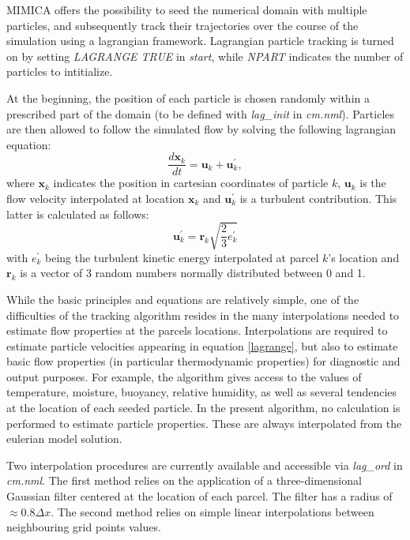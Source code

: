 \documentclass[12pt,A4,french]{article}
\begin{document}
MIMICA offers the possibility to seed the numerical domain with multiple particles, and subsequently track their trajectories over the course of the simulation using a lagrangian framework. Lagrangian particle tracking is turned on by setting {\it LAGRANGE TRUE} in {\it start}, while {\it NPART} indicates the number of particles to intitialize.

At the beginning, the position of each particle is chosen randomly within a prescribed part of the domain (to be defined with {\it lag\_init} in {\it cm.nml}). Particles are then allowed to follow the simulated flow by solving the following lagrangian equation:
\begin{equation}
    \label{lagrange}
    \frac{d\mathbf{x}_k}{dt} = \mathbf{u}_k + \mathbf{u}_k^{\prime},
\end{equation}
where $\mathbf{x}_k$ indicates the position in cartesian coordinates of particle $k$, $\mathbf{u}_k$ is the flow velocity interpolated at location $\mathbf{x}_k$ and $\mathbf{u}_k^{\prime}$ is a turbulent contribution. This latter is calculated as follows:
\begin{equation}
    \mathbf{u}_k^{\prime} = \mathbf{r}_k \sqrt{\frac{2}{3}e^{\prime}_k}
\end{equation}
with $e^{\prime}_k$ being the turbulent kinetic energy interpolated at parcel $k$'s location and $\mathbf{r}_k$ is a vector of 3 random numbers normally distributed between 0 and 1. 

While the basic principles and equations are relatively simple, one of the difficulties of the tracking algorithm resides in the many interpolations needed to estimate flow properties at the parcels locations. Interpolations are required to estimate particle velocities appearing in equation \ref{lagrange}, but also to estimate basic flow properties (in particular thermodynamic properties) for diagnostic and output purposes. For example, the algorithm gives access to the values of temperature, moisture, buoyancy, relative humidity, as well as several tendencies at the location of each seeded particle. In the present algorithm, no calculation is performed to estimate particle properties. These are always interpolated from the eulerian model solution.

Two interpolation procedures are currently available and accessible via {\it lag\_ord} in {\it cm.nml}. The first method relies on the application of a three-dimensional Gaussian filter centered at the location of each parcel. The filter has a radius of $\approx 0.8\Delta x$. The second method relies on simple linear interpolations between  neighbouring grid points values.
\end{document}
